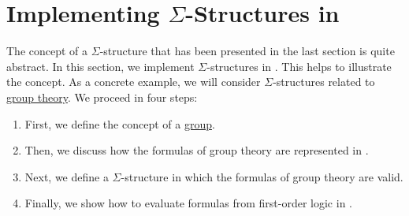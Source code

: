 \section{Implementing $\Sigma$-Structures in \texorpdfstring{\Fsharp}{F\#}}
The concept of a $\Sigma$-structure that has been presented in the last section is quite abstract. In this
section, we implement $\Sigma$-structures in \Fsharp. This helps to illustrate the concept. As a
concrete example, we will consider $\Sigma$-structures related to
\href{https://en.wikipedia.org/wiki/Group_theory}{group theory}. 
We proceed in four steps:
\begin{enumerate}
\item First, we define the concept of a \href{https://en.wikipedia.org/wiki/Group_(mathematics)}{group}.
\item Then, we discuss how the formulas of group theory are represented in \Fsharp.
\item Next, we define a $\Sigma$-structure in which the formulas of group theory are valid.
\item Finally, we show how to evaluate formulas from first-order logic in \Fsharp.
\end{enumerate}

